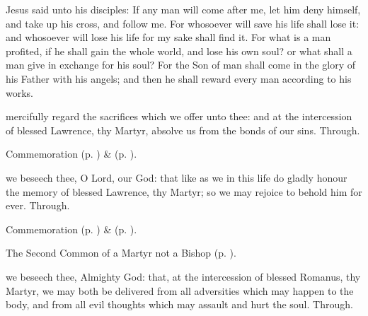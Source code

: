  Jesus said unto his disciples: If any man will come after me, let him deny himself, and take up his cross, and follow me. For whosoever will save his life shall lose it: and whosoever will lose his life for my sake shall find it. For what is a man profited, if he shall gain the whole world, and lose his own soul? or what shall a man give in exchange for his soul? For the Son of man shall come in the glory of his Father with his angels; and then he shall reward every man according to his works.


\secret
{} mercifully regard the sacrifices which we offer unto thee: and at the intercession of blessed Lawrence, thy Martyr, absolve us from the bonds of our sins. Through.

\begin{rubric}
	Commemoration  (p. \pageref{RomanusSecret}) \&  (p. \pageref{SPSaints}).
\end{rubric}


\postcommunion
{} we beseech thee, O Lord, our God: that like as we in this life do gladly honour the memory of blessed Lawrence, thy Martyr; so we may rejoice to behold him for ever. Through.

\begin{rubric}
	Commemoration  (p. \pageref{RomanusPostcommunion}) \&  (p. \pageref{SPSaints}).
\end{rubric}



\begin{rubric}
	The Second Common of a Martyr not a Bishop (p. \pageref{CommonMartyrNotBishopII}).
\end{rubric}

\collect\label{RomanusCollect}
 we beseech thee, Almighty God: that, at the intercession of blessed Romanus, thy Martyr, we may both be delivered from all adversities which may happen to the body, and from all evil thoughts which may assault and hurt the soul. Through.

